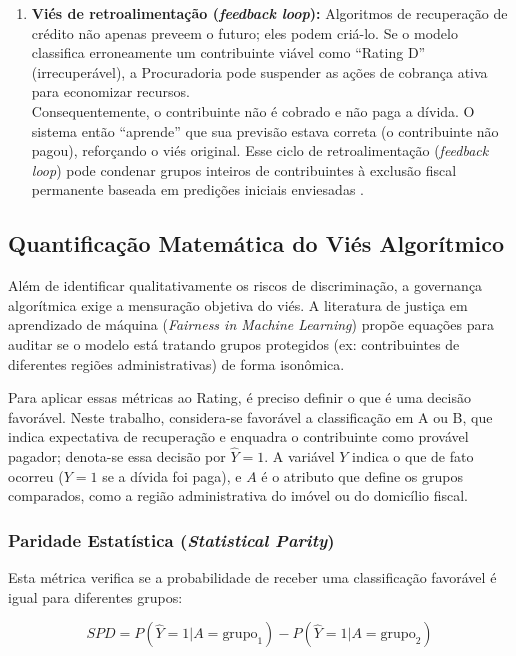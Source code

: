 \begin{enumerate}
    \item \textbf{Viés de retroalimentação (\textit{feedback loop}):}
    Algoritmos de recuperação de crédito não apenas preveem o futuro; eles podem criá-lo. Se o modelo classifica erroneamente um contribuinte viável como ``Rating D'' (irrecuperável), a Procuradoria pode suspender as ações de cobrança ativa para economizar recursos. 
    \\
    Consequentemente, o contribuinte não é cobrado e não paga a dívida.  O sistema então ``aprende'' que sua previsão estava correta (o contribuinte não pagou), reforçando o viés original.  Esse ciclo de retroalimentação (\textit{feedback loop}) pode condenar grupos inteiros de contribuintes à exclusão fiscal permanente baseada em predições iniciais enviesadas \cite{ensignRunawayFeedbackLoops2018}.
\end{enumerate}

\subsection{Quantificação Matemática do Viés Algorítmico}
\label{subsec:vies_metricas}

Além de identificar qualitativamente os riscos de discriminação, a governança algorítmica exige a mensuração objetiva do viés. A literatura de justiça em aprendizado de máquina (\textit{Fairness in Machine Learning}) propõe equações para auditar se o modelo está tratando grupos protegidos (ex: contribuintes de diferentes regiões administrativas) de forma isonômica.

Para aplicar essas métricas ao Rating, é preciso definir o que é uma decisão favorável. Neste trabalho, considera-se favorável a classificação em A ou B, que indica expectativa de recuperação e enquadra o contribuinte como provável pagador; denota-se essa decisão por $\hat{Y}=1$. A variável $Y$ indica o que de fato ocorreu ($Y=1$ se a dívida foi paga), e $A$ é o atributo que define os grupos comparados, como a região administrativa do imóvel ou do domicílio fiscal.

\subsubsection{Paridade Estatística (\textit{Statistical Parity})}
Esta métrica verifica se a probabilidade de receber uma classificação favorável é igual para diferentes grupos:

\begin{equation}
    SPD = P(\hat{Y}=1 | A=\text{grupo}_1) - P(\hat{Y}=1 | A=\text{grupo}_2)
\end{equation}

